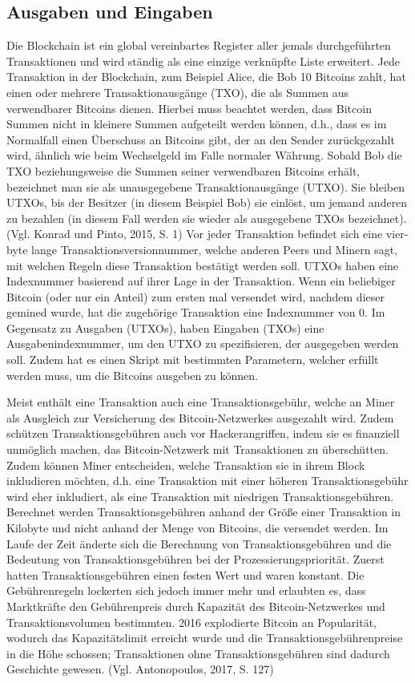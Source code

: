 \subsection{Ausgaben und Eingaben}
Die Blockchain ist ein global vereinbartes Register aller jemals durchgeführten Transaktionen und wird ständig als eine einzige 
verknüpfte Liste erweitert. Jede Transaktion in der Blockchain, zum Beispiel Alice, die Bob 10 Bitcoins zahlt, hat einen oder
mehrere Transaktionausgänge (TXO), die als Summen aus verwendbarer Bitcoins dienen. Hierbei muss beachtet werden, dass Bitcoin
Summen nicht in kleinere Summen aufgeteilt werden können, d.h., dass es im Normalfall einen Überschuss an Bitcoins gibt, der an 
den Sender zurückgezahlt wird, ähnlich wie beim Wechselgeld im Falle normaler Währung. Sobald Bob die TXO beziehungsweise 
die Summen seiner verwendbaren Bitcoins erhält, bezeichnet man sie als unausgegebene Transaktionausgänge (UTXO). Sie bleiben
UTXOs, bis der Besitzer (in diesem Beispiel Bob) sie einlöst, um jemand anderen zu bezahlen (in diesem Fall werden sie wieder
als ausgegebene TXOs bezeichnet). (Vgl. Konrad und Pinto, 2015, S. 1) Vor jeder Transaktion befindet sich eine vier-byte lange
Transaktionsversionnummer, welche anderen Peers und Minern sagt, mit welchen Regeln diese Transaktion bestätigt werden soll.
UTXOs haben eine Indexnummer basierend auf ihrer Lage in der Transaktion. Wenn ein beliebiger Bitcoin (oder nur ein Anteil)
zum ersten mal versendet wird, nachdem dieser gemined wurde, hat die zugehörige Transaktion eine Indexnummer von 0. Im Gegensatz
zu Ausgaben (UTXOs), haben Eingaben (TXOs) eine Ausgabenindexnummer, um den UTXO zu spezifisieren, der ausgegeben werden soll.
Zudem hat es einen Skript mit bestimmten Parametern, welcher erfüllt werden muss, um die Bitcoins ausgeben zu können.

Meist enthält eine Transaktion auch eine Transaktionsgebühr, welche an Miner als Ausgleich zur Versicherung des Bitcoin-Netzwerkes
ausgezahlt wird. Zudem schützen Transaktionsgebühren auch vor Hackerangriffen, indem sie es finanziell unmöglich machen, das 
Bitcoin-Netzwerk mit Transaktionen zu überschütten. Zudem können Miner entscheiden, welche Transaktion sie in ihrem Block
inkludieren möchten, d.h. eine Transaktion mit einer höheren Transaktionsgebühr wird eher inkludiert, als eine Transaktion mit
niedrigen Transaktionsgebühren. Berechnet werden Transaktionsgebühren anhand der Größe einer Transaktion in Kilobyte und nicht 
anhand der Menge von Bitcoins, die versendet werden. Im Laufe der Zeit änderte sich die Berechnung von Transaktionsgebühren
und die Bedeutung von Transaktionsgebühren bei der Prozessierungspriorität. Zuerst hatten Transaktionsgebühren einen festen 
Wert und waren konstant. Die Gebührenregeln lockerten sich jedoch immer mehr und erlaubten es, dass Marktkräfte den
Gebührenpreis durch Kapazität des Bitcoin-Netzwerkes und Transaktionsvolumen bestimmten. 2016 explodierte Bitcoin an Popularität,
wodurch das Kapazitätslimit erreicht wurde und die Transaktionsgebührenpreise in die Höhe schossen; Transaktionen ohne
Transaktionsgebühren sind dadurch Geschichte gewesen. (Vgl. Antonopoulos, 2017, S. 127)

